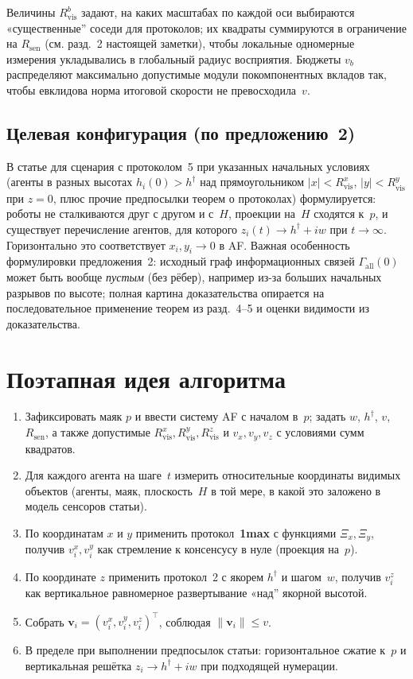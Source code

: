 \documentclass[12pt,a4paper]{article}
\begin{document}
Величины $R_{\mathrm{vis}}^b$ задают, на каких масштабах по каждой оси выбираются «существенные'' соседи для протоколов; их квадраты суммируются в ограничение на $R_{\mathrm{sen}}$ (см. разд.~2 настоящей заметки), чтобы локальные одномерные измерения укладывались в глобальный радиус восприятия. Бюджеты $v_b$ распределяют максимально допустимые модули покомпонентных вкладов так, чтобы евклидова норма итоговой скорости не превосходила~$v$.

\subsection{Целевая конфигурация (по предложению~2)}

В статье для сценария с протоколом~5 при указанных начальных условиях (агенты в разных высотах $h_i(0)>h^\dagger$ над прямоугольником $|x|<R_{\mathrm{vis}}^x$, $|y|<R_{\mathrm{vis}}^y$ при $z=0$, плюс прочие предпосылки теорем о протоколах) формулируется: роботы не сталкиваются друг с другом и с~$H$, проекции на~$H$ сходятся к~$p$, и существует перечисление агентов, для которого $z_i(t)\to h^\dagger+i w$ при $t\to\infty$. Горизонтально это соответствует $x_i,y_i\to 0$ в AF. Важная особенность формулировки предложения~2: исходный граф информационных связей $\Gamma_{\mathrm{all}}(0)$ может быть вообще \emph{пустым} (без рёбер), например из-за больших начальных разрывов по высоте; полная картина доказательства опирается на последовательное применение теорем из разд.~4--5 и оценки видимости из доказательства.

\section{Поэтапная идея алгоритма}

\begin{enumerate}
  \item Зафиксировать маяк $p$ и ввести систему AF с началом в~$p$; задать $w$, $h^\dagger$, $v$, $R_{\mathrm{sen}}$, а также допустимые $R_{\mathrm{vis}}^x,R_{\mathrm{vis}}^y,R_{\mathrm{vis}}^z$ и $v_x,v_y,v_z$ с условиями сумм квадратов.
  \item Для каждого агента на шаге~$t$ измерить относительные координаты видимых объектов (агенты, маяк, плоскость~$H$ в той мере, в какой это заложено в модель сенсоров статьи).
  \item По координатам $x$ и $y$ применить протокол~\textbf{1max} с функциями $\Xi_x,\Xi_y$, получив $v_i^x,v_i^y$ как стремление к консенсусу в нуле (проекция на~$p$).
  \item По координате $z$ применить протокол~2 с якорем $h^\dagger$ и шагом~$w$, получив $v_i^z$ как вертикальное равномерное развертывание «над'' якорной высотой.
  \item Собрать $\mathbf{v}_i=(v_i^x,v_i^y,v_i^z)^\top$, соблюдая $\|\mathbf{v}_i\|\le v$.
  \item В пределе при выполнении предпосылок статьи: горизонтальное сжатие к~$p$ и вертикальная решётка $z_i\to h^\dagger+iw$ при подходящей нумерации.
\end{enumerate}
\end{document}
